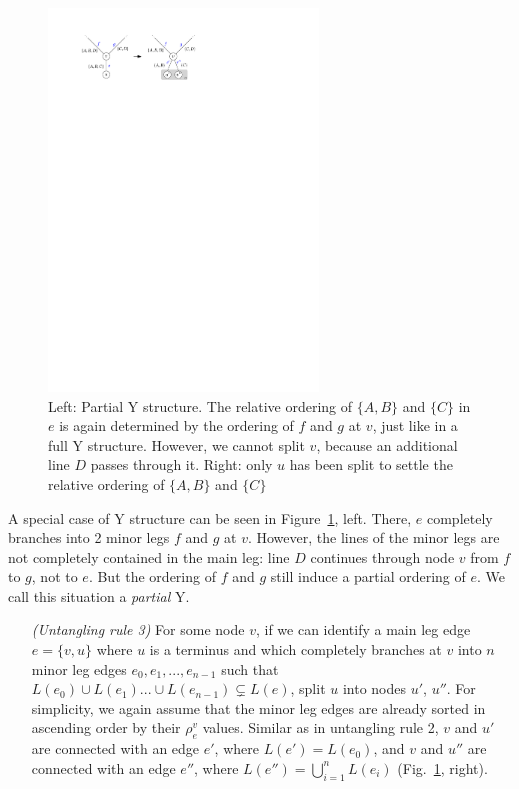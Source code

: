 \documentclass[format=acmsmall, review=false, screen=true]{acmart}
\begin{document}
\begin{figure}
  \centering
  \includegraphics[width=0.64\textwidth]{figures/untangling/y_partial.pdf}
  \caption{Left: Partial Y structure. The relative ordering of $\{A, B\}$ and $\{C\}$ in $e$ is again determined by the ordering of $f$ and $g$ at $v$, just like in a full Y structure. However, we cannot split $v$, because an additional line $D$ passes through it. Right: only $u$ has been split to settle the relative ordering of $\{A, B\}$ and $\{C\}$}  
  \label{FIG:untangle_y_partial}
\end{figure}

A special case of Y structure can be seen in Figure~\ref{FIG:untangle_y_partial}, left.
There, $e$ completely branches into 2 minor legs $f$ and $g$ at $v$.
However, the lines of the minor legs are not completely contained in the main leg: line $D$ continues through node $v$ from $f$ to $g$, not to $e$.
But the ordering of $f$ and $g$ still induce a partial ordering of $e$.
We call this situation a \emph{partial} Y.

\begin{enumerate}[parsep=0.5mm, wide, labelwidth=0mm, itemindent=2.3mm]
  \setlength\itemsep{1pt}
  \item[\emph{(Untangling rule 3)}] For some node $v$, if we can identify a main leg edge $e = \{v, u\}$ where $u$ is a terminus and which completely branches at $v$ into $n$ minor leg edges $e_{0}, e_{1}, ..., e_{n-1}$ such that $L(e_{0}) \cup L(e_{1}) ... \cup L(e_{n-1}) \subsetneq L(e)$, split $u$ into nodes $u'$, $u''$.
  For simplicity, we again assume that the minor leg edges are already sorted in ascending order by their $\rho^v_e$ values. 
  Similar as in untangling rule 2, $v$ and $u'$ are connected with an edge $e'$, where $L(e') = L(e_{0})$, and $v$ and $u''$ are connected with an edge $e''$, where $L(e'') = \bigcup^{n}_{i = 1} L(e_{i})$  (Fig.~\ref{FIG:untangle_y_partial}, right).
\end{enumerate}
\end{document}
